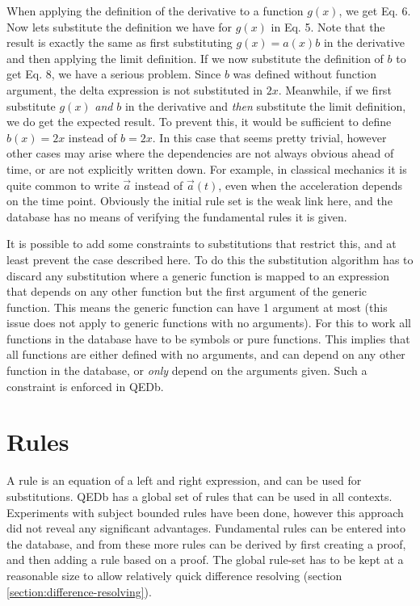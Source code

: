 \documentclass{article}
\begin{document}
When applying the definition of the derivative to a function $g(x)$, we get Eq. 6. Now lets substitute the definition we have for $g(x)$ in Eq. 5. Note that the result is exactly the same as first substituting $g(x)=a(x)b$ in the derivative and then applying the limit definition. If we now substitute the definition of $b$ to get Eq. 8, we have a serious problem. Since $b$ was defined without function argument, the delta expression is not substituted in $2x$. Meanwhile, if we first substitute $g(x)$ \emph{and} $b$ in the derivative and \emph{then} substitute the limit definition, we do get the expected result. To prevent this, it would be sufficient to define $b(x)=2x$ instead of $b=2x$. In this case that seems pretty trivial, however other cases may arise where the dependencies are not always obvious ahead of time, or are not explicitly written down. For example, in classical mechanics it is quite common to write $\vec{a}$ instead of $\vec{a}(t)$, even when the acceleration depends on the time point. Obviously the initial rule set is the weak link here, and the database has no means of verifying the fundamental rules it is given. \par
It is possible to add some constraints to substitutions that restrict this, and at least prevent the case described here. To do this the substitution algorithm has to discard any substitution where a generic function is mapped to an expression that depends on any other function but the first argument of the generic function. This means the generic function can have 1 argument at most (this issue does not apply to generic functions with no arguments). For this to work all functions in the database have to be symbols or pure functions. This implies that all functions are either defined with no arguments, and can depend on any other function in the database, or \emph{only} depend on the arguments given. Such a constraint is enforced in QEDb.

\section{Rules}
A rule is an equation of a left and right expression, and can be used for substitutions. QEDb has a global set of rules that can be used in all contexts. Experiments with subject bounded rules have been done, however this approach did not reveal any significant advantages. Fundamental rules can be entered into the database, and from these more rules can be derived by first creating a proof, and then adding a rule based on a proof. The global rule-set has to be kept at a reasonable size to allow relatively quick difference resolving (section \ref{section:difference-resolving}).
\end{document}
